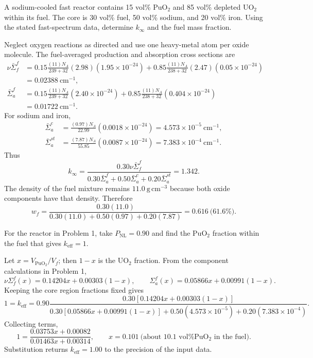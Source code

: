 

A sodium-cooled fast reactor contains 15 vol\% PuO$_2$ and 85 vol\%
depleted UO$_2$ within its fuel. The core is 30 vol\% fuel, 50 vol\% sodium,
and 20 vol\% iron. Using the stated fast-spectrum data, determine
$k_\infty$ and the fuel mass fraction.

\begin{adaptedsolution}
Neglect oxygen reactions as directed and use one heavy-metal atom per oxide
molecule. The fuel-averaged production and absorption cross sections are
\begin{align*}
\nu\bar\Sigma_f^f
&=0.15\frac{(11)N_A}{239+32}(2.98)(1.95\times10^{-24})
 +0.85\frac{(11)N_A}{238+32}(2.47)(0.05\times10^{-24})\\
&=0.02388~\mathrm{cm^{-1}},\\
\bar\Sigma_a^f
&=0.15\frac{(11)N_A}{239+32}(2.40\times10^{-24})
 +0.85\frac{(11)N_A}{238+32}(0.404\times10^{-24})\\
&=0.01722~\mathrm{cm^{-1}}.
\end{align*}
For sodium and iron,
\begin{align*}
\bar\Sigma_a^c
&=\frac{(0.97)N_A}{22.99}(0.0018\times10^{-24})
=4.573\times10^{-5}~\mathrm{cm^{-1}},\\
\bar\Sigma_a^{st}
&=\frac{(7.87)N_A}{55.85}(0.0087\times10^{-24})
=7.383\times10^{-4}~\mathrm{cm^{-1}}.
\end{align*}
Thus
\[
k_\infty=
\frac{0.30\nu\bar\Sigma_f^f}
{0.30\bar\Sigma_a^f+0.50\bar\Sigma_a^c+0.20\bar\Sigma_a^{st}}
=\boxed{1.342}.
\]
The density of the fuel mixture remains $11.0~\mathrm{g\,cm^{-3}}$ because
both oxide components have that density. Therefore
\[
w_f=\frac{0.30(11.0)}{0.30(11.0)+0.50(0.97)+0.20(7.87)}
=\boxed{0.616\ \text{(61.6\%)}}.
\]
\end{adaptedsolution}

\newpage
{}

For the reactor in Problem 1, take $P_{\mathrm{NL}}=0.90$ and find the
PuO$_2$ fraction within the fuel that gives $k_{\mathrm{eff}}=1$.

\begin{adaptedsolution}
Let $x=V_{\mathrm{PuO_2}}/V_f$; then $1-x$ is the UO$_2$ fraction. From the
component calculations in Problem 1,
\[
\nu\Sigma_f^f(x)=0.14204x+0.00303(1-x),
\qquad
\Sigma_a^f(x)=0.05866x+0.00991(1-x).
\]
Keeping the core region fractions fixed gives
\[
1=k_{\mathrm{eff}}
=0.90\frac{0.30[0.14204x+0.00303(1-x)]}
{0.30[0.05866x+0.00991(1-x)]
 +0.50(4.573\times10^{-5})+0.20(7.383\times10^{-4})}.
\]
Collecting terms,
\[
1=\frac{0.03753x+0.00082}{0.01463x+0.00314},
\qquad
x=\boxed{0.101\ \text{(about 10.1 vol\% PuO$_2$ in the fuel)}}.
\]
Substitution returns $k_{\mathrm{eff}}=1.00$ to the precision of the input
data.
\end{adaptedsolution}
